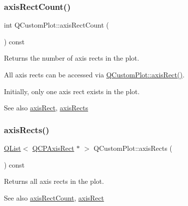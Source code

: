 \subsubsection{\texorpdfstring{axis\+Rect\+Count()}{axisRectCount()}}
{\footnotesize\ttfamily int Q\+Custom\+Plot\+::axis\+Rect\+Count (\begin{DoxyParamCaption}{ }\end{DoxyParamCaption}) const}

Returns the number of axis rects in the plot.

All axis rects can be accessed via \hyperlink{class_q_custom_plot_ae5eefcb5f6ca26689b1fd4f6e25b42f9}{Q\+Custom\+Plot\+::axis\+Rect()}.

Initially, only one axis rect exists in the plot.

\begin{DoxySeeAlso}{See also}
\hyperlink{class_q_custom_plot_ae5eefcb5f6ca26689b1fd4f6e25b42f9}{axis\+Rect}, \hyperlink{class_q_custom_plot_a12af771429e2d7e313c8c5d5fca068fe}{axis\+Rects} 
\end{DoxySeeAlso}
\mbox{\label{class_q_custom_plot_a12af771429e2d7e313c8c5d5fca068fe}} 
\subsubsection{\texorpdfstring{axis\+Rects()}{axisRects()}}
{\footnotesize\ttfamily \hyperlink{class_q_list}{Q\+List}$<$ \hyperlink{class_q_c_p_axis_rect}{Q\+C\+P\+Axis\+Rect} $\ast$ $>$ Q\+Custom\+Plot\+::axis\+Rects (\begin{DoxyParamCaption}{ }\end{DoxyParamCaption}) const}

Returns all axis rects in the plot.

\begin{DoxySeeAlso}{See also}
\hyperlink{class_q_custom_plot_a8f85940aaac50efb466287d9d2d04ec6}{axis\+Rect\+Count}, \hyperlink{class_q_custom_plot_ae5eefcb5f6ca26689b1fd4f6e25b42f9}{axis\+Rect} 
\end{DoxySeeAlso}
\mbox{\label{class_q_custom_plot_a0cd30e29b73efd6afe096e44bc5956f5}} 
